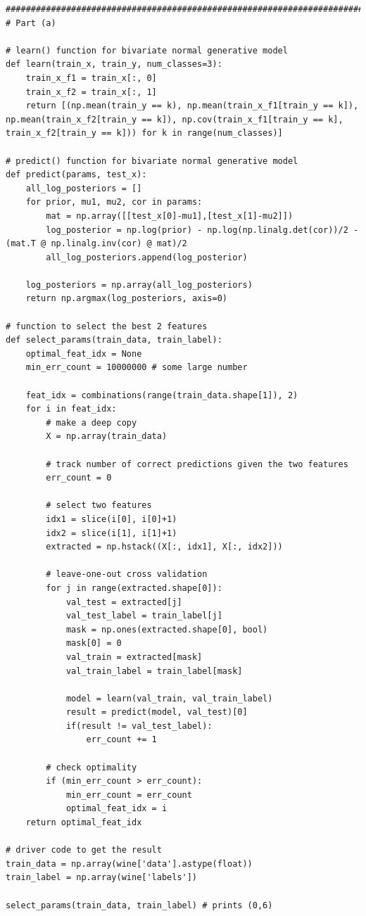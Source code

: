 \documentclass[11pt]{article}
\begin{document}
\begin{verbatim}
################################################################################
# Part (a)

# learn() function for bivariate normal generative model
def learn(train_x, train_y, num_classes=3):
    train_x_f1 = train_x[:, 0]
    train_x_f2 = train_x[:, 1]
    return [(np.mean(train_y == k), np.mean(train_x_f1[train_y == k]), np.mean(train_x_f2[train_y == k]), np.cov(train_x_f1[train_y == k], train_x_f2[train_y == k])) for k in range(num_classes)]

# predict() function for bivariate normal generative model
def predict(params, test_x):
    all_log_posteriors = []
    for prior, mu1, mu2, cor in params:
        mat = np.array([[test_x[0]-mu1],[test_x[1]-mu2]])
        log_posterior = np.log(prior) - np.log(np.linalg.det(cor))/2 - (mat.T @ np.linalg.inv(cor) @ mat)/2
        all_log_posteriors.append(log_posterior)
    
    log_posteriors = np.array(all_log_posteriors)
    return np.argmax(log_posteriors, axis=0)

# function to select the best 2 features
def select_params(train_data, train_label):
    optimal_feat_idx = None
    min_err_count = 10000000 # some large number
    
    feat_idx = combinations(range(train_data.shape[1]), 2)
    for i in feat_idx:
        # make a deep copy
        X = np.array(train_data)

        # track number of correct predictions given the two features
        err_count = 0

        # select two features
        idx1 = slice(i[0], i[0]+1)
        idx2 = slice(i[1], i[1]+1)
        extracted = np.hstack((X[:, idx1], X[:, idx2]))

        # leave-one-out cross validation
        for j in range(extracted.shape[0]):
            val_test = extracted[j]
            val_test_label = train_label[j]
            mask = np.ones(extracted.shape[0], bool)
            mask[0] = 0
            val_train = extracted[mask]
            val_train_label = train_label[mask]
            
            model = learn(val_train, val_train_label)
            result = predict(model, val_test)[0]
            if(result != val_test_label):
                err_count += 1

        # check optimality
        if (min_err_count > err_count):
            min_err_count = err_count
            optimal_feat_idx = i
    return optimal_feat_idx

# driver code to get the result
train_data = np.array(wine['data'].astype(float))
train_label = np.array(wine['labels'])

select_params(train_data, train_label) # prints (0,6)
\end{verbatim}
\end{document}

